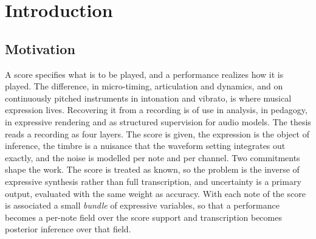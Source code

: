 \documentclass[11pt,a4paper]{report}
\begin{document}
\begin{abstract}
At the waveform, a differentiable harmonic model with exactly marginalized
amplitudes recovers within-note pitch curves without a pitch tracker and
refines note boundaries given a local alignment, but its bands under-cover
the reference, because the two measure slightly different quantities. Inside
that inference the score graph is better than a purely temporal prior at
phrase scale, once also on held-out tracks, and none of the three spans
tested shows a gain beyond the common offset of a passage.
\end{abstract}


\tableofcontents

\chapter{Introduction}\label{ch:intro}

\section{Motivation}
A score specifies what is to be played, and a performance realizes how it is
played. The difference, in micro-timing, articulation and dynamics, and on
continuously pitched instruments in intonation and vibrato, is where musical
expression lives. Recovering it from a recording is of use in analysis, in
pedagogy, in expressive rendering and as structured supervision for audio
models. The thesis reads a recording as four layers. The score is given, the
expression is the object of inference, the timbre is a nuisance that the
waveform setting integrates out exactly, and the noise is modelled per note
and per channel. Two commitments shape the work. The score is treated as
known, so the problem is the inverse of expressive synthesis rather than
full transcription, and uncertainty is a primary output, evaluated with the
same weight as accuracy. With each note of the score is associated a small
\emph{bundle} of expressive variables, so that a performance becomes a
per-note field over the score support and transcription becomes posterior
inference over that field.
\end{document}
